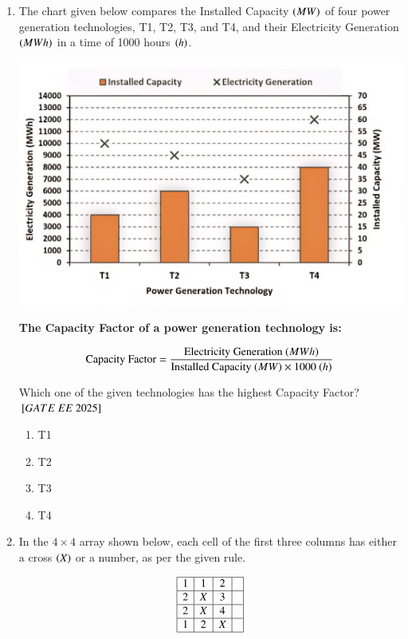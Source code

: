 \documentclass[journal,12pt,onecolumn]{IEEEtran}
\theoremstyle{remark}
\begin{document}
\begin{enumerate}
   \item The chart given below compares the Installed Capacity  $\left(MW\right)$ of four power generation technologies, T1, T2, T3, and T4, and their Electricity Generation  $\left(MWh\right)$ in a time of 1000 hours  $\left(h\right)$.

\medskip

\includegraphics[scale=0.25]{figs/charts.jpg}

\medskip

\textbf{The Capacity Factor of a power generation technology is:}

\[
\text{Capacity Factor} = \frac{\text{Electricity Generation  $\left(MWh\right)$}}{\text{Installed Capacity  $\left(MW\right)$} \times 1000 \text{  $\left(h\right)$}}
\]

\medskip
 Which one of the given technologies has the highest Capacity Factor? \\    
${}\left[GATE\ EE\ 2025\right]$\\
\begin{enumerate}[label=(\Alph*)]
\item T1 
  \item T2
  \item T3
 \item T4 
    \end{enumerate}

   \item In the \(4 \times 4\) array shown below, each cell of the first three columns has either a cross  $\left(X\right)$ or a number, as per the given rule.

\bigskip

\[
\begin{array}{|c|c|c|c|}
\hline
1 & 1 & 2 & \\
\hline
2 & X & 3 & \\
\hline
2 & X & 4 & \\
\hline
1 & 2 & X & \\
\hline
\end{array}
\]


\end{enumerate}
\end{document}

